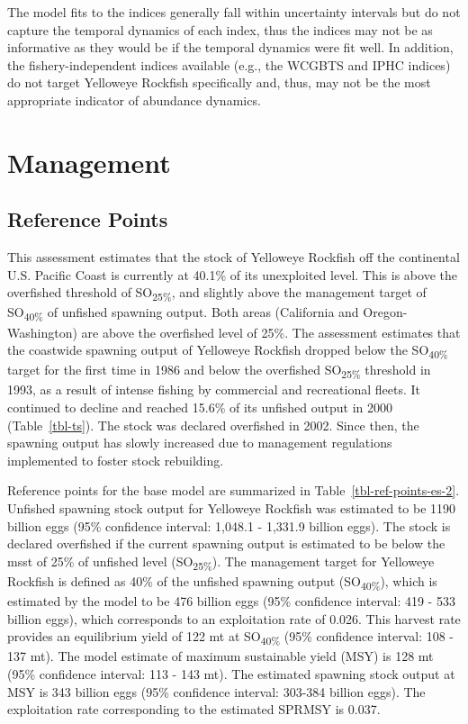 \documentclass[
]{scrartcl}
\begin{document}
The model fits to the indices generally fall within uncertainty
intervals but do not capture the temporal dynamics of each index, thus
the indices may not be as informative as they would be if the temporal
dynamics were fit well. In addition, the fishery-independent indices
available (e.g., the WCGBTS and IPHC indices) do not target Yelloweye
Rockfish specifically and, thus, may not be the most appropriate
indicator of abundance dynamics.

\newpage{}

\section{Management}\label{management}

\subsection{Reference Points}\label{reference-points-1}

This assessment estimates that the stock of Yelloweye Rockfish off the
continental U.S. Pacific Coast is currently at 40.1\% of its unexploited
level. This is above the overfished threshold of SO\textsubscript{25\%},
and slightly above the management target of SO\textsubscript{40\%} of
unfished spawning output. Both areas (California and Oregon-Washington)
are above the overfished level of 25\%. The assessment estimates that
the coastwide spawning output of Yelloweye Rockfish dropped below the
SO\textsubscript{40\%} target for the first time in 1986 and below the
overfished SO\textsubscript{25\%} threshold in 1993, as a result of
intense fishing by commercial and recreational fleets. It continued to
decline and reached 15.6\% of its unfished output in 2000
(Table~\ref{tbl-ts}). The stock was declared overfished in 2002. Since
then, the spawning output has slowly increased due to management
regulations implemented to foster stock rebuilding.

Reference points for the base model are summarized in
Table~\ref{tbl-ref-points-es-2}. Unfished spawning stock output for
Yelloweye Rockfish was estimated to be 1190 billion eggs (95\%
confidence interval: 1,048.1 - 1,331.9 billion eggs). The stock is
declared overfished if the current spawning output is estimated to be
below the \gls{msst} of 25\% of unfished level (SO\textsubscript{25\%}).
The management target for Yelloweye Rockfish is defined as 40\% of the
unfished spawning output (SO\textsubscript{40\%}), which is estimated by
the model to be 476 billion eggs (95\% confidence interval: 419 - 533
billion eggs), which corresponds to an exploitation rate of 0.026. This
harvest rate provides an equilibrium yield of 122 mt at
SO\textsubscript{40\%} (95\% confidence interval: 108 - 137 mt). The
model estimate of maximum sustainable yield (MSY) is 128 mt (95\%
confidence interval: 113 - 143 mt). The estimated spawning stock output
at MSY is 343 billion eggs (95\% confidence interval: 303-384 billion
eggs). The exploitation rate corresponding to the estimated SPRMSY is
0.037.
\end{document}
